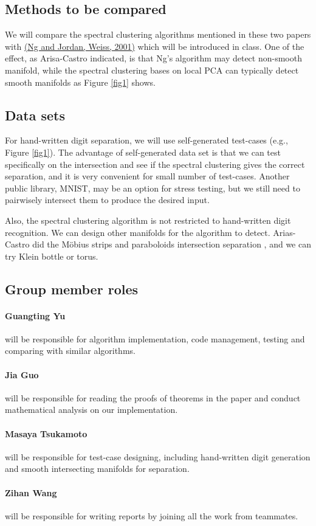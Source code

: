 \documentclass[10pt,twocolumn]{article}
\begin{document}
\subsection*{Methods to be compared}
We will compare the spectral clustering algorithms mentioned in these two papers with \href{https://papers.nips.cc/paper/2092-on-spectral-clustering-analysis-and-an-algorithm.pdf}{(Ng and Jordan, Weiss, 2001)}\cite{Ng:2001:SCA:2980539.2980649} which will be introduced in class.
One of the effect, as Arisa-Castro indicated, is that Ng's algorithm may detect non-smooth manifold, while the spectral clustering bases on local PCA can typically detect smooth manifolds as Figure \ref{fig1} shows.\cite{Arias-Castro:2017:SCB:3122009.3122018}


\subsection*{Data sets}
For hand-written digit separation, we will use self-generated test-cases (e.g., Figure \ref{fig1}).
The advantage of self-generated data set is that we can test specifically on the intersection and see if the spectral clustering gives the correct separation, and it is very convenient for small number of test-cases.
Another public library, MNIST, may be an option for stress testing, but we still need to pairwisely intersect them to produce the desired input.

Also, the spectral clustering algorithm is not restricted to hand-written digit recognition.
We can design other manifolds for the algorithm to detect.
Arias-Castro did the M\"{o}bius strips and paraboloids intersection separation \cite{Arias-Castro:2017:SCB:3122009.3122018}, and we can try Klein bottle or torus.

\subsection*{Group member roles}
\paragraph{Guangting Yu} will be responsible for algorithm implementation, code management, testing and comparing with similar algorithms.
\paragraph{Jia Guo} will be responsible for reading the proofs of theorems in the paper and conduct mathematical analysis on our implementation.
\paragraph{Masaya Tsukamoto} will be responsible for test-case designing, including hand-written digit generation and smooth intersecting manifolds for separation.
\paragraph{Zihan Wang} will be responsible for writing reports by joining all the work from teammates.

\newpage
{}

\end{document}
